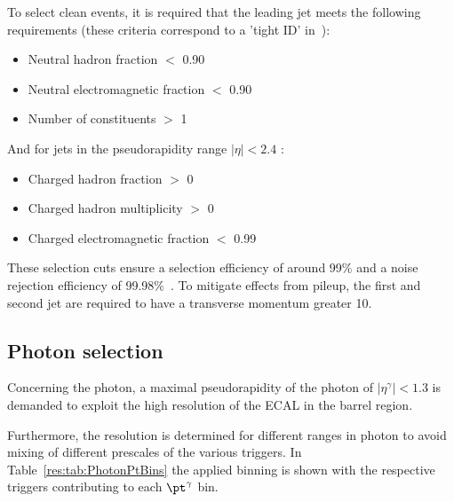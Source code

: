 To select clean \GAMJET events, it is required that the leading jet meets the following requirements (these criteria correspond to a 'tight ID' in~\cite{bib:JetIDRecommendation_7TeV,bib:AN:JetId_8TeV}):
\begin{itemize}

 \item Neutral hadron fraction $<$ 0.90
 \item Neutral electromagnetic fraction $<$ 0.90
 \item Number of constituents $>$ 1
\end{itemize}

 And for jets in the pseudorapidity range $|\eta| < 2.4 $ :
\begin{itemize}
 \item Charged hadron fraction $>$ 0
 \item Charged hadron multiplicity $>$ 0
 \item Charged electromagnetic fraction $<$ 0.99
\end{itemize}
These selection cuts ensure a selection efficiency of around 99\% and a noise rejection efficiency of 99.98\%~\cite{bib:JetIDRecommendation_7TeV}.
To mitigate effects from pileup, the first and second jet are required to have a transverse momentum greater 10\gev.

\subsection{Photon selection}
Concerning the photon, a maximal pseudorapidity of the photon of $|\eta^{\gamma}| < 1.3$ is demanded to exploit the high resolution of the ECAL in the barrel region.

Furthermore, the resolution is determined for different ranges in photon \pt to avoid mixing of different prescales of the various triggers. 
In Table~\ref{res:tab:PhotonPtBins} the applied binning is shown with the respective triggers contributing to each $\pt^{\gamma}$ bin.


\renewcommand{\arraystretch}{1.5}
\begin{table}[htb]
\centering
\caption{Photon \pt bins and corresponding triggers.}
\label{res:tab:PhotonPtBins}
\end{table}

